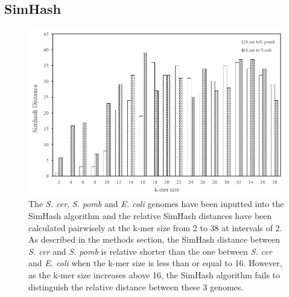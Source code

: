 \documentclass[12pt, letterpaper]{article}
\begin{document}
\subsection{SimHash}
\FloatBarrier
\begin{figure}[h!]
	\centering
	\includegraphics[width=1.0\textwidth]{Simhash_kmer_result.png}
	\caption{The \textit{S. cer}, \textit{S. pomb} and \textit{E. coli} genomes have been inputted into the SimHash algorithm and the relative SimHash distances have been calculated pairwisely at the k-mer size from 2 to 38 at intervals of 2. As described in the methods section, the SimHash distance between \textit{S. cer} and \textit{S. pomb} is relative shorter than the one between \textit{S. cer} and \textit{E. coli} when the k-mer size is less than or equal to 16. However, as the k-mer size increases above 16, the SimHash algorithm fails to distinguish the relative distance between these 3 genomes.}
	\label{fig:SimHashDescription}
\end{figure}
\FloatBarrier
\end{document}
